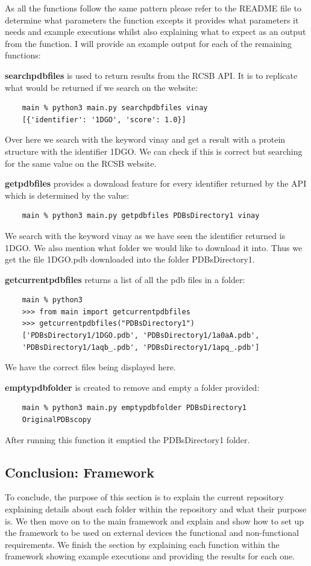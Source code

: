 \documentclass[]{final_report}
\begin{document}
As all the functions follow the same pattern please refer to the README file to determine what parameters the function excepts it provides what parameters it needs and example executions whilst also explaining what to expect as an output from the function. I will provide an example output for each of the remaining functions:

\textbf{searchpdbfiles} is used to return results from the RCSB API. It is to replicate what would be returned if we search on the website:
\begin{lstlisting}
    main % python3 main.py searchpdbfiles vinay
    [{'identifier': '1DGO', 'score': 1.0}]
\end{lstlisting}
Over here we search with the keyword vinay and get a result with a protein structure with the identifier 1DGO. We can check if this is correct but searching for the same value on the RCSB website.

\textbf{getpdbfiles} provides a download feature for every identifier returned by the API which is determined by the value:
\begin{lstlisting}
    main % python3 main.py getpdbfiles PDBsDirectory1 vinay
\end{lstlisting}
We search with the keyword vinay as we have seen the identifier returned is 1DGO. We also mention what folder we would like to download it into. Thus we get the file 1DGO.pdb downloaded into the folder PDBsDirectory1.

\textbf{getcurrentpdbfiles} returns a list of all the pdb files in a folder:
\begin{lstlisting}
    main % python3
    >>> from main import getcurrentpdbfiles
    >>> getcurrentpdbfiles("PDBsDirectory1")
    ['PDBsDirectory1/1DGO.pdb', 'PDBsDirectory1/1a0aA.pdb',
    'PDBsDirectory1/1aqb_.pdb', 'PDBsDirectory1/1apq_.pdb']
\end{lstlisting}
We have the correct files being displayed here.

\textbf{emptypdbfolder} is created to remove and empty a folder provided:
\begin{lstlisting}
    main % python3 main.py emptypdbfolder PDBsDirectory1  
    OriginalPDBscopy
\end{lstlisting}
After running this function it emptied the PDBsDirectory1 folder.

\subsection{Conclusion: Framework}
To conclude, the purpose of this section is to explain the current repository explaining details about each folder within the repository and what their purpose is. We then move on to the main framework and explain and show how to set up the framework to be used on external devices the functional and non-functional requirements. We finish the section by explaining each function within the framework showing example executions and providing the results for each one.
\end{document}
